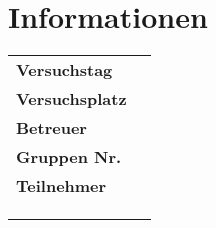 \restoregeometry

\chapter*{Informationen}
\label{chap:info}

\begin{tabular}{l l}

	{\textbf{Versuchstag}} \hspace{1cm} & \hspace{1cm} {\datum}\\[0,2cm]
	{\textbf{Versuchsplatz}} \hspace{1cm} & \hspace{1cm} {\platz}\\[0,2cm]
	{\textbf{Betreuer}} \hspace{1cm} & \hspace{1cm} {\betreuer}\\[1,2cm]
	{\textbf{Gruppen Nr.}} \hspace{1cm} & \hspace{1cm} {\groupnr}\\[0.2cm]
	{\textbf{Teilnehmer}} \hspace{1cm} & \hspace{1cm} {\teilnehmerm}\\[0.2cm]
						  \hspace{1cm} & \hspace{1cm} {\emailm}\\[0.2cm]
						  \hspace{1cm} & \hspace{1cm} {\teilnehmerp}\\[0.2cm]
						  \hspace{1cm} & \hspace{1cm} {\emailp}\\[0.2cm]


\end{tabular}